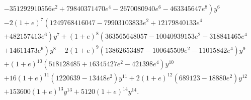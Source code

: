 \[\begin{align}
 {} & - \left. 351292910556 e^2 + 79840371470 e^4 - 2670080940 e^6 - 463345647 e^8 \right) y^6 \nonumber \\
 {} & - \left. 2 (1 + e)^7 \left(1249768416047 - 79903103833 e^2 + 12179840133 e^4 \right.\right. \nonumber \\
 {} & + \left. 482157413 e^6\right) y^7 + (1 + e)^8 \left(363565648057 - 10040939153 e^2 - 318841465 e^4 \right. \nonumber \\
 {} & + \left. 14611473 e^6 \right) y^8 - 2 (1 + e)^9 \left(13862653487 - 100645509 e^2 - 11015842 e^4\right) y^9 \nonumber \\
 {} & + \left. (1 + e)^{10} \left(518128485 + 16345427 e^2 - 421398 e^4\right) y^{10} \right. \nonumber \\
 {} & + \left. 16 (1 + e)^{11} \left(1220639 - 13448 e^2 \right) y^{11} + 2 (1 + e)^{12} \left(689123 - 18880 e^2 \right) y^{12} \right. \nonumber \\
 {} & + \left. 153600 (1 + e)^{13} y^{13} + 5120 (1 + e)^{14} {y}^{14}. \right.
\end{align}

\]
